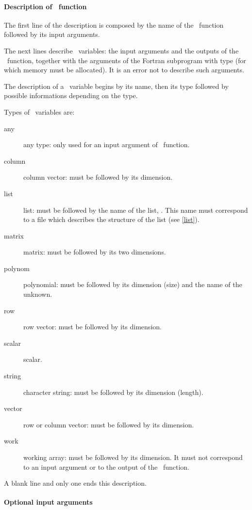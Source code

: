 \paragraph{Description of \SCI\ function}
\label{scilab}

The first line of the description is composed by the name of the \SCI\
function followed by its input arguments.

The next lines describe \SCI\ variables: the input arguments and the
outputs of the \SCI\ function, together with the arguments of the Fortran
subprogram with type \T{work} (for which memory must be allocated).
It is an error not to describe such arguments.

The description of a \SCI\ variable begins by its name, then its type followed
by possible informations depending on the type.

Types of \SCI\ variables are:
\begin{description}
  \item[any] any type: only used for an input argument of \SCI\ function.
  \item[column] column vector: must be followed by its dimension.
  \item[list] list: must be followed by the name of the list,
. This name must correspond to a file 
which describes the structure of the list (see \ref{list}).
  \item[matrix] matrix: must be followed by its two dimensions.
  \item[polynom] polynomial: must be followed by its dimension (size) and the
name of the unknown.
  \item[row] row vector: must be followed by its dimension.
  \item[scalar] scalar.
  \item[string] character string: must be followed by its dimension
(length).
  \item[vector] row or column vector: must be followed by its dimension.
  \item[work] working array: must be followed by its dimension. It must not
correspond to an input argument or to the output of the \SCI\ function.
\end{description}

\smallskip

A blank line and only one ends this description.

\paragraph{Optional input arguments}

